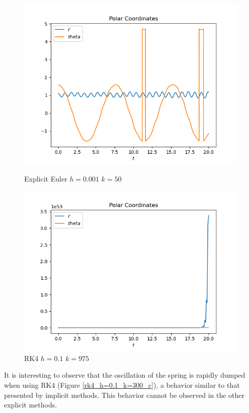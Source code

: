 \documentclass{scrartcl}
\begin{document}
\begin{figure}[h]
\centering
\begin{minipage}[b]{0.45\textwidth}
\centering
\includegraphics[width=\textwidth]{../Plots/ExpEuler/exp_euler_k=50_h=0.001_c}
\caption{Explicit Euler $h=0.001$ $k=50$}
\label{exp_euler_k=50_h=0.001_c_2}
\end{minipage}
\hfill
\begin{minipage}[b]{0.45\textwidth}
\centering
\includegraphics[width=\textwidth]{../Plots/RK4/rk4_h=0.1_k=975_c}
\caption{RK4 $h=0.1$ $k=975$}
\label{rk4_h=0.1_k=975_c}
\end{minipage}
\end{figure}

It is interesting to observe that the oscillation of the spring is rapidly dumped when using RK4 (Figure \ref{rk4_h=0.1_k=300_c}), a behavior similar to that presented by implicit methods.
This behavior cannot be observed in the other explicit methods.
\end{document}
